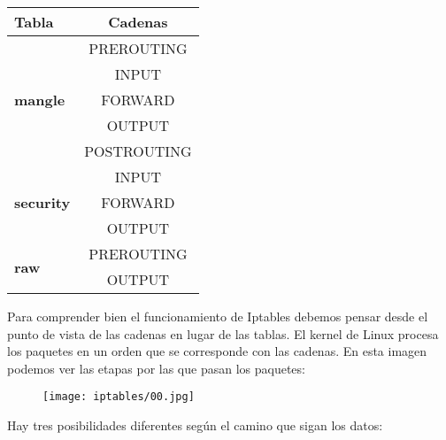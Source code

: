 \begin{longtable}{l | c}
\textbf{Tabla} & \textbf{Cadenas}\\\hline
\multirow{5}{*}{\textbf{mangle}} & PREROUTING\\
& INPUT\\
& FORWARD\\
& OUTPUT\\
& POSTROUTING\\\hline
\multirow{3}{*}{\textbf{security}} & INPUT\\
& FORWARD\\
& OUTPUT\\\hline
\multirow{2}{*}{\textbf{raw}} & PREROUTING\\
& OUTPUT\\
\end{longtable}

Para comprender bien el funcionamiento de Iptables debemos pensar desde el punto de vista de las cadenas en lugar de las tablas. El kernel de Linux procesa los paquetes en un orden que se corresponde con las cadenas. En esta imagen podemos ver las etapas por las que pasan los paquetes:

\begin{figure}[H]
    \centering
    \texttt{[image: iptables/00.jpg]}
\end{figure}

Hay tres posibilidades diferentes según el camino que sigan los datos:

